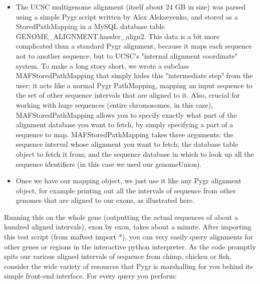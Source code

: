 \documentclass{howto}
\begin{document}
\begin{itemize}
\item
The UCSC multigenome alignment (itself about 24 GB in size) was parsed using a simple Pygr script written by Alex Alekseyenko, and stored as a StoredPathMapping in a MySQL database table GENOME_ALIGNMENT.hassler_align2.  This data is a bit more complicated than a standard Pygr alignment, because it maps each sequence not to another sequence, but to UCSC's "internal alignment coordinate" system.  To make a long story short, we wrote a subclass MAFStoredPathMapping that simply hides this "intermediate step" from the user; it acts like a normal Pygr PathMapping, mapping an input sequence to the set of other sequence intervals that are aligned to it.  Also, crucial for working with huge sequences (entire chromosomes, in this case), MAFStoredPathMapping allows you to specify exactly what part of the alignment database you want to fetch, by simply specifying a part of a sequence to map.  MAFStoredPathMapping takes three arguments: the sequence interval whose alignment you want to fetch; the database table object to fetch it from; and the sequence database in which to look up all the sequence identifiers (in this case we used our genomeUnion).

\item
Once we have our mapping object, we just use it like any Pygr alignment object, for example printing out all the intervals of sequence from other genomes that are aligned to our exons, as illustrated here. 

\end{itemize}
Running this on the whole gene (outputting the actual sequences of about a hundred aligned intervals), exon by exon, takes about a minute.  After importing this test script (from maftest import *), you can very easily query alignments for other genes or regions in the interactive python interpreter.  As the code promptly spits our various aligned intervals of sequence from chimp, chicken or fish, consider the wide variety of resources that Pygr is marshalling for you behind its simple front-end interface.  For every query you perform:
\end{document}
